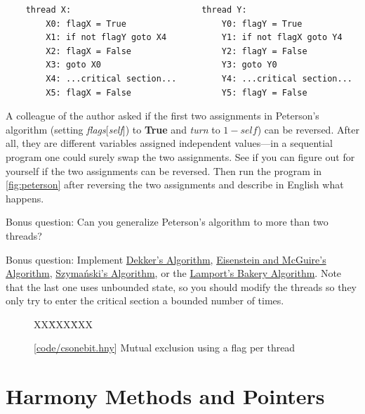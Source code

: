 \documentclass{report}
\newcommand{\harmonysource}[1]{
\begin{tabbing}
XX\=XXX\=XXX\kill
    
\end{tabbing}
}
\newcommand{\harmonylink}[1]{%
[\href{https://harmony.cs.cornell.edu/#1}{\underline{#1}}]%
}
\newenvironment{code}{
\tcolorbox
}{
\endtcolorbox
}
\begin{document}
\begin{problems}
\begin{code}
\begin{verbatim}
    thread X:                          thread Y:
        X0: flagX = True                   Y0: flagY = True
        X1: if not flagY goto X4           Y1: if not flagX goto Y4
        X2: flagX = False                  Y2: flagY = False
        X3: goto X0                        Y3: goto Y0
        X4: ...critical section...         Y4: ...critical section...
        X5: flagX = False                  Y5: flagY = False
\end{verbatim}
\end{code}
\item \label{ex:reorder}
A colleague of the author asked if the first two assignments in
Peterson's algorithm (setting \textit{flags}[\textit{self}])
to \textbf{True} and \textit{turn} to $1 - \mathit{self}$) can be reversed.
After all, they are different variables assigned independent values---in a
sequential program one could surely swap the two assignments.
See if you can figure out for yourself if the two assignments can be
reversed.  Then run the program in \autoref{fig:peterson} after reversing
the two assignments and describe in English what happens.
\item Bonus question:
Can you generalize Peterson's algorithm to more than two threads?
\item Bonus question:
Implement
\href{https://en.wikipedia.org/wiki/Dekker%27s_algorithm}{Dekker's Algorithm},
\href{https://en.wikipedia.org/wiki/Eisenberg_%26_McGuire_algorithm}{Eisenstein and McGuire's Algorithm},
\href{https://en.wikipedia.org/wiki/Szymanski%27s_algorithm}{Szymański's Algorithm}, or the
\href{https://en.wikipedia.org/wiki/Lamport%27s_bakery_algorithm}{Lamport's Bakery Algorithm}.
Note that the last one uses unbounded state, so you should modify the threads so they
only try to enter the critical section a bounded number of times.
\end{problems}

\begin{figure}
\begin{code}
\harmonysource{csonebit}
\end{code}
\caption{\harmonylink{code/csonebit.hny} Mutual exclusion using a flag per thread}
\label{fig:csonebit}
\end{figure}

\chapter{Harmony Methods and Pointers}
\label{ch:method}
%
\end{document}
